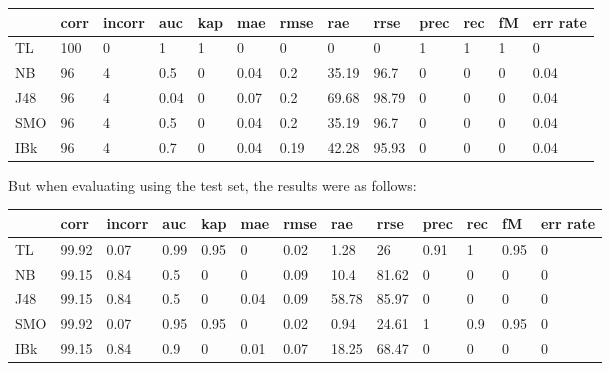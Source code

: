 \documentclass[a4paper,12pt, english]{article}
\begin{document}
\begin{small}
\begin{center}
    \begin{tabular}{ | l | l | l | l | l | l | l | l | l | l | l | l | l |}
    \hline
      	& corr & incorr  & auc & kap & mae & rmse & rae & rrse & prec & rec & fM & err rate\\ \hline
      	TL & 100 & 0 & 1 & 1 & 0 & 0 & 0 & 0 & 1 & 1 & 1 & 0\\ \hline
	NB & 96 & 4 & 0.5 & 0 & 0.04 & 0.2 & 35.19 & 96.7 & 0 & 0 & 0 & 0.04\\ \hline
	J48 & 96 & 4 & 0.04 & 0 & 0.07 & 0.2 & 69.68 & 98.79 & 0 & 0 & 0 & 0.04\\ \hline
	SMO & 96 & 4 & 0.5 & 0 & 0.04 & 0.2 & 35.19 & 96.7 & 0 & 0 & 0 & 0.04\\ \hline
	IBk & 96 & 4 & 0.7 & 0 & 0.04 & 0.19 & 42.28 & 95.93 & 0 & 0 & 0 & 0.04\\ \hline  
    \end{tabular}       
\end{center}
\end{small}

But when evaluating using the test set, the results were as follows:
\begin{small}
\begin{center}
    \begin{tabular}{ | l | l | l | l | l | l | l | l | l | l | l | l | l |}
    \hline
      	& corr & incorr  & auc & kap & mae & rmse & rae & rrse & prec & rec & fM & err rate\\ \hline
      	TL & 99.92 & 0.07 & 0.99 & 0.95 & 0 & 0.02 & 1.28 & 26 & 0.91 & 1 & 0.95 & 0\\ \hline
	NB & 99.15 & 0.84 & 0.5 & 0 & 0 & 0.09 & 10.4 & 81.62 & 0 & 0 & 0 & 0\\ \hline
	J48 & 99.15 & 0.84 & 0.5 & 0 & 0.04 & 0.09 & 58.78 & 85.97 & 0 & 0 & 0 & 0\\ \hline
	SMO & 99.92 & 0.07 & 0.95 & 0.95 & 0 & 0.02 & 0.94 & 24.61 & 1 & 0.9 & 0.95 & 0\\ \hline
	IBk & 99.15 & 0.84 & 0.9 & 0 & 0.01 & 0.07 & 18.25 & 68.47 & 0 & 0 & 0 & 0\\ \hline  
    \end{tabular}       
\end{center}
\end{small}

\newpage
\end{document}
